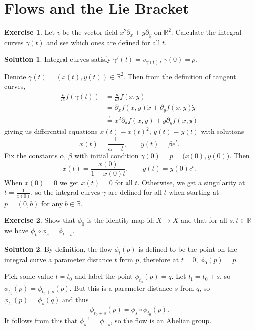 \documentclass[11pt, a4paper]{report}
\theoremstyle{definition}
\newtheorem{ex}{Exercise}[part]
\newtheorem{sol}{Solution}[part]
\begin{document}
\section{Flows and the Lie Bracket}

\begin{ex}

Let $v$ be the vector field $x^2 \partial_x + y \partial_y$ on $\mathbb{R}^2$. Calculate the integral curves $\gamma(t)$ and see which ones are defined for all $t$.

\end{ex}

\begin{sol}

Integral curves satisfy $\gamma'(t) = v_{\gamma(t)}$, $\gamma(0) = p$.

Denote $\gamma(t) = (x(t), y(t)) \in \mathbb{R}^2$. Then from the definition of tangent curves,
\begin{align*}
    \frac{d}{dt} f(\gamma(t)) &= \frac{d}{dt} f(x, y) \\
        &= \partial_x f(x, y) \dot{x} + \partial_y f(x, y) \dot{y} \\
        &\overset{!}{=} x^2 \partial_x f(x, y) + y \partial_y f(x, y)
\end{align*}
giving us differential equations $\dot{x}(t) = {x(t)}^2$, $\dot{y}(t) = y(t)$ with solutions
\[
    x(t) = \frac{1}{\alpha - t}, \qquad
    y(t) = \beta e^t.
\]
Fix the constants $\alpha$, $\beta$ with initial condition $\gamma(0) = p = \bigl( x(0), y(0) \bigr)$. Then
\[
    x(t) = \frac{x(0)}{1 - x(0)t}, \qquad
    y(t) = y(0) e^t.
\]
When $x(0) = 0$ we get $x(t) = 0$ for all $t$. Otherwise, we get a singularity at $t = \frac{1}{x(0)}$, so the integral curves $\gamma$ are defined for all $t$ when starting at $p = (0, b)$ for any $b \in \mathbb{R}$.

\end{sol}

\begin{ex}

Show that $\phi_0$ is the identity map $\text{id}: X \to X$ and that for all $s, t \in \mathbb{R}$ we have $\phi_t \circ \phi_s = \phi_{t + s}$.

\end{ex}

\begin{sol}

By definition, the flow $\phi_t(p)$ is defined to be the point on the integral curve a parameter distance $t$ from $p$, therefore at $t = 0$, $\phi_0(p) = p$.

Pick some value $t = t_0$ and label the point $\phi_{t_0}(p) = q$. Let $t_1 = t_0 + s$, so $\phi_{t_1}(p) = \phi_{t_0 + s}(p)$. But this is a parameter distance $s$ from $q$, so $\phi_{t_1}(p) = \phi_s(q)$ and thus
\[
    \phi_{t_0 + s}(p) = \phi_s \circ \phi_{t_0}(p).
\]
It follows from this that $\phi_s^{-1} = \phi_{-s}$, so the flow is an Abelian group.

\end{sol}
\end{document}
